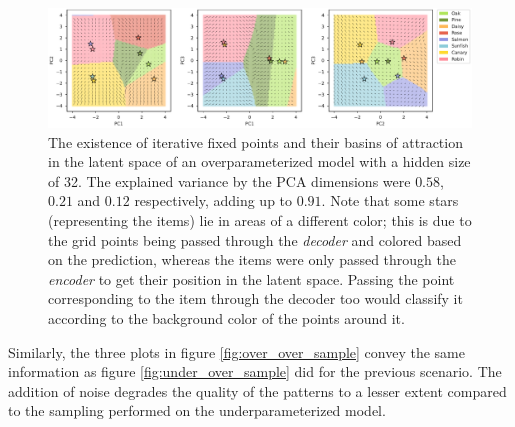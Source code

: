 \documentclass[11pt]{article}
\theoremstyle{remark}
\begin{document}
\begin{figure}
  \centering
  \includegraphics[width=\linewidth]{1_over_32_attr_grid_triplet_legend_2.pdf}
  \caption{The existence of iterative fixed points and their basins of attraction in the latent space of an overparameterized model with a hidden size of 32. The explained variance by the PCA dimensions were $0.58$, $0.21$ and $0.12$ respectively, adding up to $0.91$. Note that some stars (representing the items) lie in areas of a different color; this is due to the grid points being passed through the \textit{decoder} and colored based on the prediction, whereas the items were only passed through the \textit{encoder} to get their position in the latent space. Passing the point corresponding to the item through the decoder too would classify it according to the background color of the points around it.}
  \label{fig:triplet_attr}
\end{figure}

Similarly, the three plots in figure \ref{fig:over_over_sample} convey the same information as figure \ref{fig:under_over_sample} did for the previous scenario. The addition of noise degrades the quality of the patterns to a lesser extent compared to the sampling performed on the underparameterized model.
\end{document}
